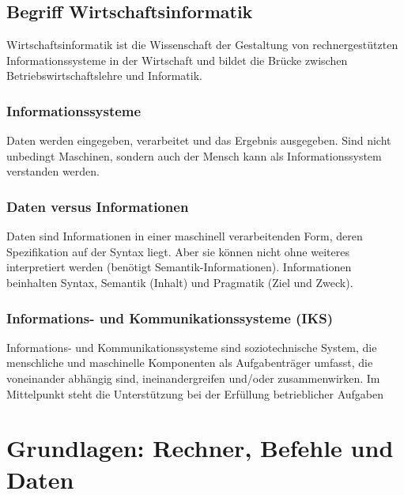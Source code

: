 \documentclass{article}
\begin{document}
\begin{adjustwidth}{2em}{2em}
\begin{adjustwidth}{2em}{2em}
			\subsection{Begriff Wirtschaftsinformatik}
			\begin{adjustwidth}{1em}{}
				Wirtschaftsinformatik ist die Wissenschaft der Gestaltung von rechnergestützten Informationssysteme in der Wirtschaft und bildet die Brücke zwischen Betriebswirtschaftslehre und Informatik.
				\subsubsection{Informationssysteme}
				\begin{adjustwidth}{1em}{}
					Daten werden eingegeben, verarbeitet und das Ergebnis ausgegeben. Sind nicht unbedingt Maschinen, sondern auch der Mensch kann als Informationssystem verstanden werden.
				\end{adjustwidth}
				\subsubsection{Daten versus Informationen}
				\begin{adjustwidth}{1em}{}
					Daten sind Informationen in einer maschinell verarbeitenden Form, deren Spezifikation auf der Syntax liegt. Aber sie können nicht ohne weiteres interpretiert werden (benötigt Semantik-Informationen). Informationen beinhalten Syntax, Semantik (Inhalt) und Pragmatik (Ziel und Zweck).
				\end{adjustwidth}
				\subsubsection{Informations- und Kommunikationssysteme (IKS)}
				\begin{adjustwidth}{1em}{}
					Informations- und Kommunikationssysteme sind soziotechnische System, die menschliche und maschinelle Komponenten als Aufgabenträger umfasst, die voneinander abhängig sind, ineinandergreifen und/oder zusammenwirken. Im Mittelpunkt steht die Unterstützung bei der Erfüllung betrieblicher Aufgaben
				\end{adjustwidth}
			\end{adjustwidth}
		\end{adjustwidth}
		
		\section{Grundlagen: Rechner, Befehle und Daten}
		\begin{adjustwidth}{2em}{2em}

\end{adjustwidth}
\end{adjustwidth}
\end{document}

